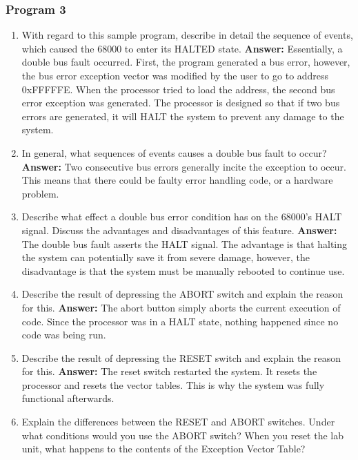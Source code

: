 \documentclass[12pt, twocolumn]{article}
\begin{document}
\subsubsection{Program 3}
\begin{enumerate}
	\item With regard to this sample program, describe in detail the sequence of events, which caused the 68000 to enter its HALTED state.
	\subitem \hspace{-0.7cm}\textbf{Answer:} Essentially, a double bus fault occurred. First, the program generated a bus error, however, the bus error exception vector was modified by the user to go to address 0xFFFFFE. When the processor tried to load the address, the second bus error exception was generated. The processor is designed so that if two bus errors are generated, it will HALT the system to prevent any damage to the system.
	\item In general, what sequences of events causes a double bus fault to occur?
	\subitem \hspace{-0.7cm}\textbf{Answer:} Two consecutive bus errors generally incite the exception to occur. This means that there could be faulty error handling code, or a hardware problem.
	\item Describe what effect a double bus error condition has on the 68000’s HALT signal. Discuss the advantages and disadvantages of this feature.
	\subitem \hspace{-0.7cm}\textbf{Answer:} The double bus fault asserts the HALT signal. The advantage is that halting the system can potentially save it from severe damage, however, the disadvantage is that the system must be manually rebooted to continue use.
	\item Describe the result of depressing the ABORT switch and explain the reason for this.
	\subitem \hspace{-0.7cm}\textbf{Answer:} The abort button simply aborts the current execution of code. Since the processor was in a HALT state, nothing happened since no code was being run.
	\item Describe the result of depressing the RESET switch and explain the reason for this.
	\subitem \hspace{-0.7cm}\textbf{Answer:} The reset switch restarted the system. It resets the processor and resets the vector tables. This is why the system was fully functional afterwards.
	\item Explain the differences between the RESET and ABORT switches. Under what conditions would you use the ABORT switch? When you reset the lab unit, what happens to the contents of the Exception Vector Table?

\end{enumerate}
\end{document}
